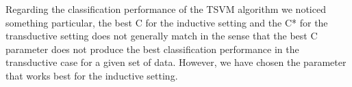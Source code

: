 Regarding the classification performance of the TSVM algorithm we
noticed something particular, the best C for the inductive setting and the C{*} for the transductive
setting does not generally match in the sense that the best C parameter
does not produce the best classification performance in the transductive case for a given set of data.
However, we have chosen the parameter that works best for the inductive
setting.





{}


